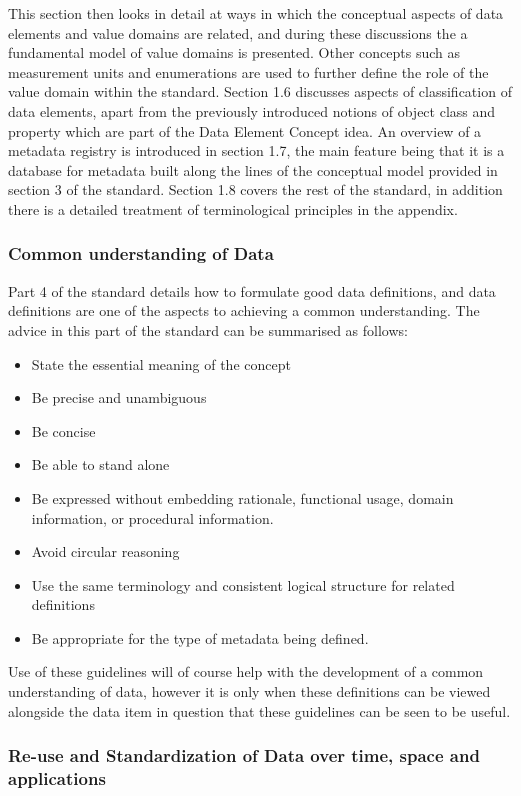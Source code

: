 \documentclass{llncs}
\begin{document}
This section then looks in detail at ways in which the conceptual aspects of data elements and value domains are related, and during these discussions the a fundamental model of value domains is presented. Other concepts such as measurement units and enumerations are used to further define the role of the value domain within the standard. Section 1.6 discusses aspects of classification of data elements, apart from the previously introduced notions of object class and property which are part of the Data Element Concept idea. An overview of a metadata registry is introduced in section 1.7, the main feature being that it is a database for metadata built along the lines of the conceptual model provided in section 3 of the standard. Section 1.8 covers the rest of the standard, in addition there is a detailed treatment of terminological principles in the appendix.



\subsubsection{Common understanding of Data}

Part 4 of the standard details how to formulate good data definitions, and data definitions are one of the aspects to achieving a common understanding. The advice in this part of the standard can be summarised as follows: 
\begin{itemize}
\item State the essential meaning of the concept
\item Be precise and unambiguous
\item Be concise
\item Be able to stand alone
\item Be expressed without embedding rationale, functional usage, domain information, or procedural information.
\item Avoid circular reasoning
\item Use the same terminology and consistent logical structure for related definitions
\item Be appropriate for the type of metadata being defined.
\end{itemize}
Use of these guidelines will of course help with the development of a common understanding of data, however it is only when these definitions can be viewed alongside the data item in question that these guidelines can be seen to be useful.


\subsubsection{Re-use and Standardization of Data over time, space and applications}
\end{document}
